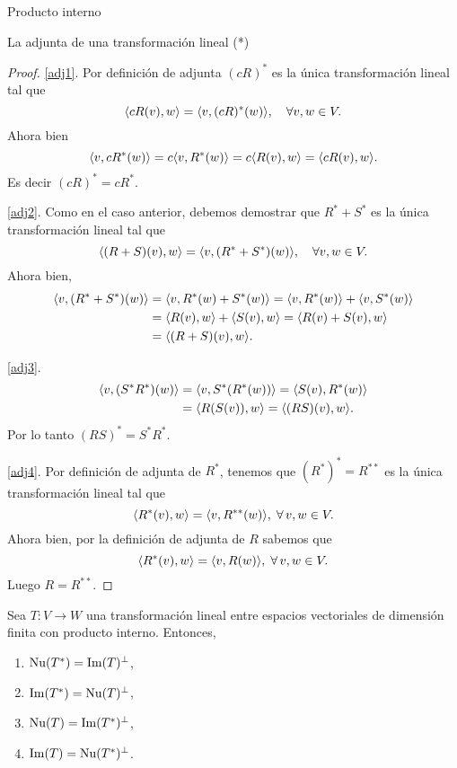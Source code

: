 \begin{chapter}{Producto interno}
\begin{section}{La adjunta de una transformaci\'on lineal (*)}
\begin{proof}
            \ref{adj1}. Por definición de adjunta $(cR)^*$ es la única transformación lineal tal que
            $$
            \langle cR(v),w\rangle = \langle v,(cR)^*(w)\rangle, \quad \forall v,w \in V.
            $$
            Ahora bien
            $$
            \langle v,cR^*(w)\rangle = c\langle v,R^*(w)\rangle = c\langle R(v),w\rangle =  \langle cR(v),w\rangle. 
            $$
            Es decir $(cR)^* = cR^*$.
            
            \ref{adj2}. Como en el caso anterior, debemos demostrar que  $R^* + S^*$ es la única transformación lineal tal que
            $$ 
            \langle (R+S)(v),w\rangle = \langle v,(R^* + S^*)(w)\rangle, \quad \forall v,w \in V.
            $$
            Ahora bien,
            \begin{align*}
            \langle v,(R^* + S^*)(w)\rangle &= \langle v,R^*(w) + S^*(w)\rangle =  \langle v,R^*(w) \rangle+\langle v, S^*(w)\rangle \\
            &=  \langle R(v),w \rangle+\langle S(v), w\rangle =  \langle R(v) + S(v), w\rangle \\
            &=  \langle (R+S)(v), w\rangle .
            \end{align*}

            \ref{adj3}. 
            \begin{align*}
            \langle v,(S^*R^*)(w)\rangle &= \langle v, S^*(R^*(w))\rangle =  \langle S(v),R^*(w) \rangle \\
            &=  \langle R(S(v)),w \rangle =  \langle (RS)(v), w\rangle .
            \end{align*}
            Por lo tanto  $(RS)^* = S^*R^*$.
            
            \ref{adj4}. Por definición de adjunta de $R^*$, tenemos que $ (R^*)^*=R^{**}$  es la única transformación lineal tal que 
            $$
            \langle R^*(v), w\rangle = \langle v, R^{**}(w)\rangle  , \; \forall\, v,w \in V.
            $$ 
            Ahora bien, por la definición de adjunta de $R$ sabemos que 
            $$
            \langle R^*(v), w\rangle = \langle v, R(w)\rangle , \; \forall\, v,w \in V.
            $$ 
            Luego $R = R^{**}$.
            
        \end{proof}
        
        
        \begin{teorema}\label{rel-adj-ort}
            Sea $T: V \to W$ una transformación lineal entre espacios vectoriales de dimensión finita con producto interno. Entonces,
            \begin{enumerate}
                \item\label{itm-nut*-imtp} $\operatorname{Nu}(T^*) = \operatorname{Im}(T)^\perp$,
                \item\label{itm-imt*-nutp} $\operatorname{Im}(T^*) = \operatorname{Nu}(T)^\perp$,
                \item\label{itm-nut-imt*p} $\operatorname{Nu}(T) = \operatorname{Im}(T^*)^\perp$,
                \item\label{itm-imt-nut*p} $\operatorname{Im}(T) = \operatorname{Nu}(T^*)^\perp$.
            \end{enumerate}
        \end{teorema}
       

\end{section}
\end{chapter}
